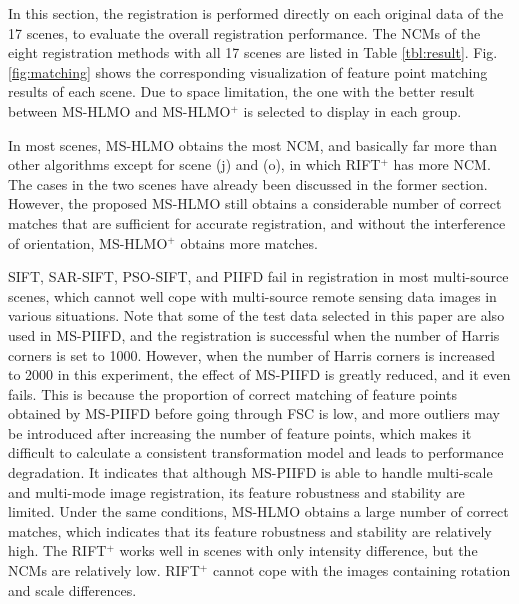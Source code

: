 In this section, the registration is performed directly on each original data of the 17 scenes, to evaluate the overall registration performance. The NCMs of the eight registration methods with all 17 scenes are listed in Table \ref{tbl:result}. Fig.\ref{fig:matching} shows the corresponding visualization of feature point matching results of each scene. Due to space limitation, the one with the better result between MS-HLMO and MS-HLMO$^+$ is selected to display in each group.

In most scenes, MS-HLMO obtains the most NCM, and basically far more than other algorithms except for scene (j) and (o), in which RIFT$^+$ has more NCM. The cases in the two scenes have already been discussed in the former section. However, the proposed MS-HLMO still obtains a considerable number of correct matches that are sufficient for accurate registration, and without the interference of orientation, MS-HLMO$^+$ obtains more matches.

SIFT, SAR-SIFT, PSO-SIFT, and PIIFD fail in registration in most multi-source scenes, which cannot well cope with multi-source remote sensing data images in various situations.
Note that some of the test data selected in this paper are also used in MS-PIIFD, and the registration is successful when the number of Harris corners is set to 1000. However, when the number of Harris corners is increased to 2000 in this experiment, the effect of MS-PIIFD is greatly reduced, and it even fails. This is because the proportion of correct matching of feature points obtained by MS-PIIFD before going through FSC is low, and more outliers may be introduced after increasing the number of feature points, which makes it difficult to calculate a consistent transformation model and leads to performance degradation. It indicates that although MS-PIIFD is able to handle multi-scale and multi-mode image registration, its feature robustness and stability are limited. Under the same conditions, MS-HLMO obtains a large number of correct matches, which indicates that its feature robustness and stability are relatively high. The RIFT$^+$ works well in scenes with only intensity difference, but the NCMs are relatively low. RIFT$^+$ cannot cope with the images containing rotation and scale differences.

